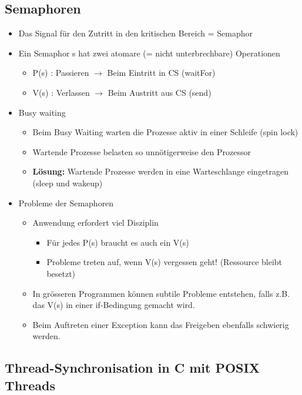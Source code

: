 \subsection{Semaphoren}
\begin{itemize}
  \item Das Signal für den Zutritt in den kritischen Bereich = Semaphor
  \item Ein Semaphor s hat zwei atomare (= nicht unterbrechbare)
        Operationen
        \begin{itemize}
          \item P(s) : Passieren $\rightarrow$ Beim Eintritt in CS (waitFor)
          \item V(s) : Verlassen $\rightarrow$ Beim Austritt aus CS (send)
        \end{itemize}
  \item Busy waiting
        \begin{itemize}
          \item Beim Busy Waiting warten die Prozesse aktiv in einer Schleife (spin lock)
          \item Wartende Prozesse belasten so unnötigerweise den Prozessor
          \item \textbf{Lösung:} Wartende Prozesse werden in eine Warteschlange eingetragen (sleep und
                wakeup)
        \end{itemize}
  \item Probleme der Semaphoren
        \begin{itemize}
          \item Anwendung erfordert viel Disziplin
                \begin{itemize}
                  \item Für jedes P(s) braucht es auch ein V(s)
                  \item Probleme treten auf, wenn V(s) vergessen geht! (Ressource bleibt besetzt)
                \end{itemize}
          \item In grösseren Programmen können subtile Probleme entstehen, falls z.B. das V(s) in einer if-Bedingung gemacht wird.
          \item Beim Auftreten einer Exception kann das Freigeben ebenfalls schwierig werden.
        \end{itemize}
\end{itemize}

\subsection{Thread-Synchronisation in C mit POSIX Threads}
